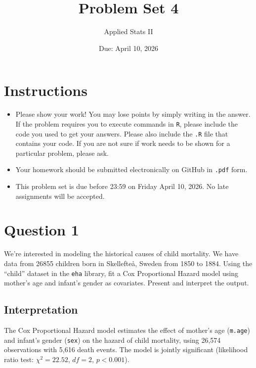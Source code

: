 \documentclass[12pt,letterpaper]{article}
\title{Problem Set 4}
\date{Due: April 10, 2026}
\author{Applied Stats II}
\begin{document}
	\maketitle
	\section*{Instructions}
	\begin{itemize}
	\item Please show your work! You may lose points by simply writing in the answer. If the problem requires you to execute commands in \texttt{R}, please include the code you used to get your answers. Please also include the \texttt{.R} file that contains your code. If you are not sure if work needs to be shown for a particular problem, please ask.
	\item Your homework should be submitted electronically on GitHub in \texttt{.pdf} form.
	\item This problem set is due before 23:59 on Friday April 10, 2026. No late assignments will be accepted.

	\end{itemize}

	\vspace{.25cm}
\section*{Question 1}
\vspace{.25cm}
\noindent We're interested in modeling the historical causes of child mortality. We have data from 26855 children born in Skellefteå, Sweden from 1850 to 1884. Using the ``child'' dataset in the \texttt{eha} library, fit a Cox Proportional Hazard model using mother's age and infant's gender as covariates. Present and interpret the output.

\vspace{.5cm}


\vspace{.5cm}



\subsection*{Interpretation}

The Cox Proportional Hazard model estimates the effect of mother's age (\texttt{m.age}) and infant's gender (\texttt{sex}) on the hazard of child mortality, using 26,574 observations with 5,616 death events. The model is jointly significant (likelihood ratio test: $\chi^2 = 22.52$, $df = 2$, $p < 0.001$).
\end{document}
